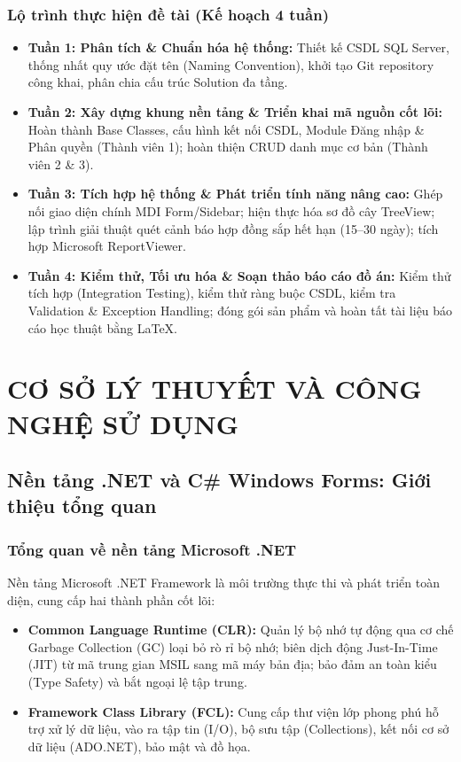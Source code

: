 \documentclass[12pt,a4paper]{report}
\begin{document}
\subsection{Lộ trình thực hiện đề tài (Kế hoạch 4 tuần)}
\begin{itemize}[leftmargin=1.0cm]
    \item \textbf{Tuần 1: Phân tích \& Chuẩn hóa hệ thống:} Thiết kế CSDL SQL Server, thống nhất quy ước đặt tên (Naming Convention), khởi tạo Git repository công khai, phân chia cấu trúc Solution đa tầng.
    \item \textbf{Tuần 2: Xây dựng khung nền tảng \& Triển khai mã nguồn cốt lõi:} Hoàn thành Base Classes, cấu hình kết nối CSDL, Module Đăng nhập \& Phân quyền (Thành viên 1); hoàn thiện CRUD danh mục cơ bản (Thành viên 2 \& 3).
    \item \textbf{Tuần 3: Tích hợp hệ thống \& Phát triển tính năng nâng cao:} Ghép nối giao diện chính MDI Form/Sidebar; hiện thực hóa sơ đồ cây TreeView; lập trình giải thuật quét cảnh báo hợp đồng sắp hết hạn (15--30 ngày); tích hợp Microsoft ReportViewer.
    \item \textbf{Tuần 4: Kiểm thử, Tối ưu hóa \& Soạn thảo báo cáo đồ án:} Kiểm thử tích hợp (Integration Testing), kiểm thử ràng buộc CSDL, kiểm tra Validation \& Exception Handling; đóng gói sản phẩm và hoàn tất tài liệu báo cáo học thuật bằng LaTeX.
\end{itemize}

\chapter{CƠ SỞ LÝ THUYẾT VÀ CÔNG NGHỆ SỬ DỤNG}

\section{Nền tảng .NET và C\# Windows Forms: Giới thiệu tổng quan}

\subsection{Tổng quan về nền tảng Microsoft .NET}
Nền tảng Microsoft .NET Framework là môi trường thực thi và phát triển toàn diện, cung cấp hai thành phần cốt lõi:
\begin{itemize}[leftmargin=1.0cm]
    \item \textbf{Common Language Runtime (CLR):} Quản lý bộ nhớ tự động qua cơ chế Garbage Collection (GC) loại bỏ rò rỉ bộ nhớ; biên dịch động Just-In-Time (JIT) từ mã trung gian MSIL sang mã máy bản địa; bảo đảm an toàn kiểu (Type Safety) và bắt ngoại lệ tập trung.
    \item \textbf{Framework Class Library (FCL):} Cung cấp thư viện lớp phong phú hỗ trợ xử lý dữ liệu, vào ra tập tin (I/O), bộ sưu tập (Collections), kết nối cơ sở dữ liệu (ADO.NET), bảo mật và đồ họa.
\end{itemize}
\end{document}

